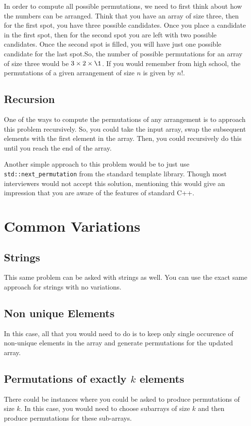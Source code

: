 In order to compute all possible permutations, we need to first think about how the numbers can be arranged. Think that you have an array of size three, then for the first spot, you have three possible candidates. Once you place a candidate in the first spot, then for the second spot you are left with two possible candidates. Once the second spot is filled, you will have just one possible candidate for the last spot.So, the number of possible permutations for an array of size three would be $3 \times 2 \times \1 $. If you would remember from high school, the permutations of a given arrangement of size $n$ is given by $n!$. 

\subsection{Recursion}

One of the ways to compute the permutations of any arrangement is to approach this problem recursively. So, you could take the input array, swap the subsequent elements with the first element in the array. Then, you  could recursively do this until you reach the end of the array.




Another simple approach to this problem would be to just use \lstinline[columns=fixed]{std::next_permutation} from the standard template library. Though most interviewers would not accept this solution, mentioning this would give an impression that you are aware of the features of standard C++.



\section{Common Variations}
\subsection{Strings}
This same problem can be asked with strings as well. You can use the exact same approach for strings with no variations.
\subsection{Non unique Elements}
In this case, all that you would need to do is to keep only single occurence of non-unique elements in the array and generate permutations for the updated array.

\subsection{Permutations of exactly $k$ elements}
There could be instances where you could be asked to produce permutations of size $k$. In this case, you would need to  choose subarrays of size $k$ and then produce permutations for these sub-arrays.